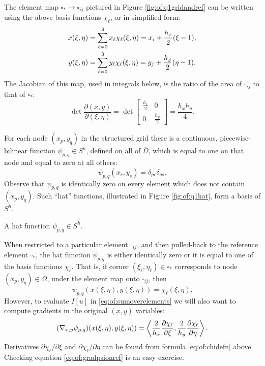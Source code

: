 The element map $\square_\ast \to \square_{ij}$ pictured in Figure \ref{fig:of:q1gridandref} can be written using the above basis functions $\chi_\ell$, or in simplified form:
\begin{align}
x(\xi,\eta) &= \sum_{\ell=0}^3 x_\ell \chi_\ell(\xi,\eta) = x_i + \frac{h_x}{2} (\xi-1), \label{eq:of:referencemap} \\
y(\xi,\eta) &= \sum_{\ell=0}^3 y_\ell \chi_\ell(\xi,\eta) = y_j + \frac{h_y}{2} (\eta-1). \notag
\end{align}
The Jacobian of this map, used in integrals below, is the ratio of the area of $\square_{ij}$ to that of $\square_\ast$:
\begin{equation}
\det\frac{\partial(x,y)}{\partial(\xi,\eta)} = \det\begin{bmatrix} \frac{h_x}{2} & 0 \\ 0 & \frac{h_y}{2} \end{bmatrix} = \frac{h_x h_y}{4}. \label{eq:of:elementjacobian}
\end{equation}

For each node $(x_p,y_q)$ in the structured grid there is a continuous, piecewise-bilinear function $\psi_{p,q} \in S^h$, defined on all of $\overline\Omega$, which is equal to one on that node and equal to zero at all others:
\begin{equation}
  \psi_{p,q}(x_r,y_s) = \delta_{pr} \delta_{qs}.  \label{eq:of:psinodewise}
\end{equation}
Observe that $\psi_{p,q}$ is identically zero on every element which does not contain $(x_p,y_q)$.  Such ``hat'' functions, illustrated in Figure \ref{fig:of:q1hat}, form a basis of $S^h$.

\begin{marginfigure}

\caption{A hat function $\psi_{p,q} \in S^h$.}
\label{fig:of:q1hat}
\end{marginfigure}

When restricted to a particular element $\square_{ij}$, and then pulled-back to the reference element $\square_\ast$, the hat function $\psi_{p,q}$ is either identically zero or it is equal to one of the basis functions $\chi_\ell$.  That is, if corner $(\xi_\ell,\eta_\ell) \in \square_\ast$ corresponds to node $(x_p,y_q) \in \overline\Omega$, under the element map onto $\square_{ij}$, then
\begin{equation}
  \psi_{p,q}(x(\xi,\eta),y(\xi,\eta)) = \chi_\ell(\xi,\eta).  \label{eq:of:psionref}
\end{equation}
However, to evaluate $I[u]$ in \eqref{eq:of:sumoverelements} we will also want to compute gradients in the original $(x,y)$ variables:
\begin{equation}
  (\nabla_{x,y} \psi_{p,q})(x(\xi,\eta),y(\xi,\eta)) = \left<\frac{2}{h_x}\frac{\partial\chi_\ell}{\partial \xi},\frac{2}{h_y}\frac{\partial\chi_\ell}{\partial \eta}\right>.   \label{eq:of:gradpsionref}
\end{equation}
Derivatives $\partial\chi_\ell/\partial \xi$ and $\partial\chi_\ell/\partial \eta$ can be found from formula \eqref{eq:of:chidefn} above.  Checking equation \eqref{eq:of:gradpsionref} is an easy exercise.

